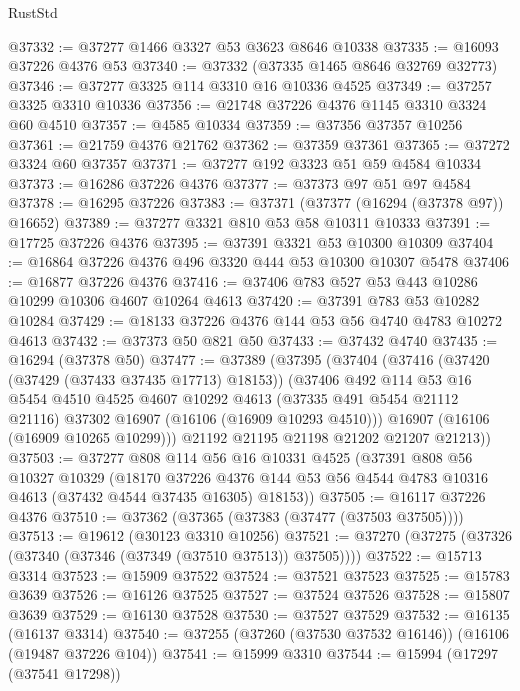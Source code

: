 \begin{lexlean}{RustStd}
\begin{coremodule}
@37332 := @37277 @1466 @3327 @53 @3623 @8646 @10338
@37335 := @16093 @37226 @4376 @53
@37340 := @37332 (@37335 @1465 @8646 @32769 @32773)
@37346 := @37277 @3325 @114 @3310 @16 @10336 @4525
@37349 := @37257 @3325 @3310 @10336
@37356 := @21748 @37226 @4376 @1145 @3310 @3324 @60 @4510
@37357 := @4585 @10334
@37359 := @37356 @37357 @10256
@37361 := @21759 @4376 @21762
@37362 := @37359 @37361
@37365 := @37272 @3324 @60 @37357
@37371 := @37277 @192 @3323 @51 @59 @4584 @10334
@37373 := @16286 @37226 @4376
@37377 := @37373 @97 @51 @97 @4584
@37378 := @16295 @37226
@37383 := @37371 (@37377 (@16294 (@37378 @97)) @16652)
@37389 := @37277 @3321 @810 @53 @58 @10311 @10333
@37391 := @17725 @37226 @4376
@37395 := @37391 @3321 @53 @10300 @10309
@37404 := @16864 @37226 @4376 @496 @3320 @444 @53 @10300 @10307 @5478
@37406 := @16877 @37226 @4376
@37416 := @37406 @783 @527 @53 @443 @10286 @10299 @10306 @4607 @10264 @4613
@37420 := @37391 @783 @53 @10282 @10284
@37429 := @18133 @37226 @4376 @144 @53 @56 @4740 @4783 @10272 @4613
@37432 := @37373 @50 @821 @50
@37433 := @37432 @4740
@37435 := @16294 (@37378 @50)
@37477 := @37389
    (@37395
      (@37404
        (@37416
          (@37420 (@37429 (@37433 @37435 @17713) @18153))
          (@37406
            @492
            @114
            @53
            @16
            @5454
            @4510
            @4525
            @4607
            @10292
            @4613
            (@37335 @491 @5454 @21112 @21116)
            @37302
            @16907
            (@16106 (@16909 @10293 @4510)))
          @16907
          (@16106 (@16909 @10265 @10299)))
        @21192
        @21195
        @21198
        @21202
        @21207
        @21213))
@37503 := @37277
    @808
    @114
    @56
    @16
    @10331
    @4525
    (@37391
      @808
      @56
      @10327
      @10329
      (@18170
        @37226
        @4376
        @144
        @53
        @56
        @4544
        @4783
        @10316
        @4613
        (@37432 @4544 @37435 @16305)
        @18153))
@37505 := @16117 @37226 @4376
@37510 := @37362 (@37365 (@37383 (@37477 (@37503 @37505))))
@37513 := @19612 (@30123 @3310 @10256)
@37521 := @37270 (@37275 (@37326 (@37340 (@37346 (@37349 (@37510 @37513)) @37505))))
@37522 := @15713 @3314
@37523 := @15909 @37522
@37524 := @37521 @37523
@37525 := @15783 @3639
@37526 := @16126 @37525
@37527 := @37524 @37526
@37528 := @15807 @3639
@37529 := @16130 @37528
@37530 := @37527 @37529
@37532 := @16135 (@16137 @3314)
@37540 := @37255 (@37260 (@37530 @37532 @16146)) (@16106 (@19487 @37226 @104))
@37541 := @15999 @3310
@37544 := @15994 (@17297 (@37541 @17298))

\end{coremodule}
\end{lexlean}
